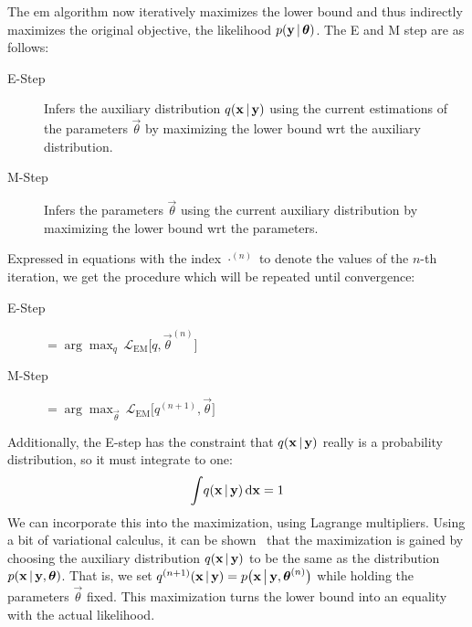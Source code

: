 	The \ac{em} algorithm now iteratively maximizes the lower bound and thus indirectly maximizes the original objective, the likelihood \( p(\boldsymbol{\mathrm{y}} \,\vert\, \boldsymbol{\mathrm{\theta}}) \). The E and M step are as follows:
	\begin{description}
		\item[E-Step] Infers the auxiliary distribution \( q(\boldsymbol{\mathrm{x}} \,\vert\, \boldsymbol{\mathrm{y}}) \) using the current estimations of the parameters \( \vec{\theta} \) by maximizing the lower bound \ac{wrt} the auxiliary distribution.
		\item[M-Step] Infers the parameters \(\vec{\theta}\) using the current auxiliary distribution by maximizing the lower bound \ac{wrt} the parameters.
	\end{description}
	Expressed in equations with the index \( \cdot^{(n)} \) to denote the values of the \(n\)-th iteration, we get the procedure which will be repeated until convergence:
	\begin{description}
		\item[E-Step]  \(\displaystyle = \arg\max_{q}\, \mathcal{L}_\mathrm{EM}\big[ q, \vec{\theta}^{(n)} \big] \)
		\item[M-Step]  \(\displaystyle = \arg\max_{\vec{\theta}}\, \mathcal{L}_\mathrm{EM}\big[ q^{(n + 1)}, \vec{\theta} \big] \)
	\end{description}
	Additionally, the E-step has the constraint that \(q(\boldsymbol{\mathrm{x}} \,\vert\, \boldsymbol{\mathrm{y}})\) really is a probability distribution, so it must integrate to one:
	\begin{align*}
		\int\! q(\boldsymbol{\mathrm{x}} \,\vert\, \boldsymbol{\mathrm{y}}) \dd{\boldsymbol{\mathrm{x}}} = 1
	\end{align*}
	We can incorporate this into the maximization, \eg using Lagrange multipliers. Using a bit of variational calculus, it can be shown~\cite{bealVariationalAlgorithmsApproximate2003a} that the maximization is gained by choosing the auxiliary distribution \(q(\boldsymbol{\mathrm{x}} \,\vert\, \boldsymbol{\mathrm{y}})\) to be the same as the distribution \( p(\boldsymbol{\mathrm{x}} \,\vert\, \boldsymbol{\mathrm{y}}, \boldsymbol{\mathrm{\theta}}) \). That is, we set \( q^{(n + 1)}(\boldsymbol{\mathrm{x}} \,\vert\, \boldsymbol{\mathrm{y}}) = p\big(\boldsymbol{\mathrm{x}} \,\big\vert\, \boldsymbol{\mathrm{y}}, \boldsymbol{\mathrm{\theta}}^{(n)}\big) \) while holding the parameters \(\vec{\theta}\) fixed. This maximization turns the lower bound into an equality with the actual likelihood.

